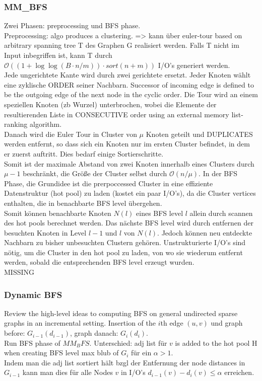 \documentclass[12pt,a4paper,titlepage,xcolor=dvipsnames]{article}
\begin{document}
\subsubsection{MM\_BFS}
Zwei Phasen: preprocessing und BFS phase.\\
Preprocessing: algo produces a clustering. => kann über euler-tour based on arbitrary spanning tree T des Graphen G realisiert werden. Falls T nicht im Input inbegriffen ist, kann T durch $\mathcal{O}((1+\log \log (B\cdot n/m))\cdot sort(n+m))$ I/O's generiert werden.\\
Jede ungerichtete Kante wird durch zwei gerichtete ersetzt. Jeder Knoten wählt eine zyklische ORDER seiner Nachbarn. Successor of incoming edge is defined to be the outgoing edge of the next node in the cyclic order. Die Tour wird an einem speziellen Knoten (zb Wurzel) unterbrochen, wobei die Elemente der resultierenden Liste in CONSECUTIVE order using an external memory list-ranking algorithm.\\
Danach wird die Euler Tour in Cluster von $\mu$ Knoten geteilt und DUPLICATES werden entfernt, so dass sich ein Knoten nur im ersten Cluster befindet, in dem er zuerst auftritt. Dies bedarf einige Sortierschritte.\\
Somit ist der maximale Abstand von zwei Knoten innerhalb eines Clusters durch $\mu -1$ beschränkt, die Größe der Cluster selbst durch $\mathcal{O}(n/\mu)$.
In der BFS Phase, die Grundidee ist die prerpoccessed Cluster in eine effiziente Datenstruktur (hot pool) zu laden (kostet ein paar I/O's), da die Cluster vertices enthalten, die in benachbarte BFS level übergehen.\\
Somit können benachbarte Knoten $N(l)$ eines BFS level $l$ allein durch scannen des hot pools berechnet werden. Das nächste BFS level wird durch entfernen der besuchten Knoten in Level $l-1$ und $l$ von $N(l)$. Jedoch können neu entdeckte Nachbarn zu bisher unbesuchten Clustern gehören. Unstrukturierte I/O's sind nötig, um die Cluster in den hot pool zu laden, von wo sie wiederum entfernt werden, sobald die entsprechenden BFS level erzeugt wurden.\\

MISSING

\subsubsection{Dynamic BFS}
Review the high-level ideas to computing BFS on general undirected sparse graphs in an incremental setting. Insertion of the $i$th edge $(u,v)$ und graph before: $G_{i-1}(d_{i-1})$, graph danach: $G_i(d_i)$.\\
Run BFS phase of $MM_BFS$. Unterschied: adj list für $v$ is added to the hot pool H when creating BFS level max blub of $G_i$ für ein $\alpha > 1$.\\
Indem man die adj list sortiert hält bzgl der Entfernung der node distances in $G_{i-1}$ kann man dies für alle Nodes $v$ in I/O's $d_{i-1}(v)-d_i(v)\leq \alpha$ erreichen.
\end{document}
